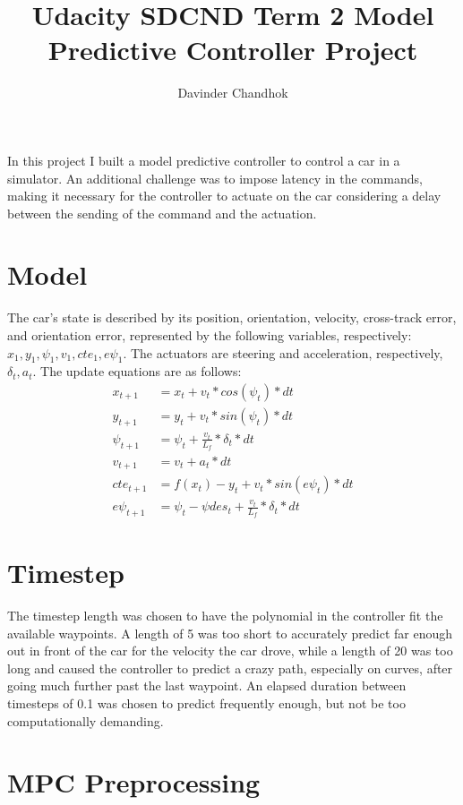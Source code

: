 \documentclass[]{scrartcl}
\title{Udacity SDCND Term 2 Model Predictive Controller Project}
\author{Davinder Chandhok}
\begin{document}
\maketitle

In this project I built a model predictive controller to control a car in a simulator. An additional challenge was to impose latency in the commands, making it necessary for the controller to actuate on the car considering a delay between the sending of the command and the actuation.

\section{Model}

The car's state is described by its position, orientation, velocity, cross-track error, and orientation error, represented by the following variables, respectively: \(x_1, y_1, \psi_1, v_1, cte_1, e\psi_1\). The actuators are steering and acceleration, respectively, \(\delta_t, a_t\). The update equations are as follows:
\begin{align}
	x_{t+1} & = x_t + v_t * cos(\psi_t) * dt \nonumber \\
	y_{t+1} & = y_t + v_t * sin(\psi_t) * dt \nonumber \\
	\psi_{t+1} & = \psi_t + \frac{v_t}{L_f} * \delta_t * dt \nonumber \\
	v_{t+1} & = v_t + a_t * dt \nonumber \\
	cte_{t+1} & = f(x_t) - y_t + v_t * sin(e\psi_t) * dt \nonumber \\
	e\psi_{t+1} & = \psi_t - {\psi}des_t + \frac{v_t}{L_f} * \delta_t * dt \nonumber
\end{align}

\section{Timestep}
The timestep length was chosen to have the polynomial in the controller fit the available waypoints. A length of 5 was too short to accurately predict far enough out in front of the car for the velocity the car drove, while a length of 20 was too long and caused the controller to predict a crazy path, especially on curves, after going much further past the last waypoint.
An elapsed duration between timesteps of 0.1 was chosen to predict frequently enough, but not be too computationally demanding.

\section{MPC Preprocessing}
\end{document}
